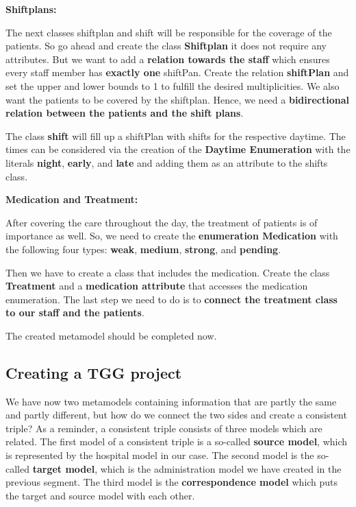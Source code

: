 \textbf{Shiftplans:}

The next classes shiftplan and shift will be responsible for the coverage of the patients. So go ahead and create the class \textbf{Shiftplan} it does not require any attributes. But we want to add a \textbf{relation towards the staff} which ensures every staff member has \textbf{exactly one} shiftPan. Create the relation \textbf{shiftPlan} and set the upper and lower bounds to 1 to fulfill the desired multiplicities. We also want the patients to be covered by the shiftplan. Hence, we need a \textbf{bidirectional relation between the patients and the shift plans}.


The class \textbf{shift} will fill up a shiftPlan with shifts for the respective daytime. The times can be considered via the creation of the \textbf{Daytime Enumeration} with the literals \textbf{night}, \textbf{early}, and \textbf{late} and adding them as an attribute to the shifts class.\newline

\textbf{Medication and Treatment:}

After covering the care throughout the day, the treatment of patients is of importance as well. So, we need to create the \textbf{enumeration Medication} with the following four types: \textbf{weak}, \textbf{medium}, \textbf{strong}, and \textbf{pending}.

Then we have to create a class that includes the medication. Create the class \textbf{Treatment} and a \textbf{medication attribute} that accesses the medication enumeration. The last step we need to do is to \textbf{connect the treatment class to our staff and the patients}. \newline

The created metamodel should be completed now.

\subsection{Creating a TGG project}



We have now two metamodels containing information that are partly the same and partly different, but how do we connect the two sides and create a consistent triple? As a reminder, a consistent triple consists of three models which are related. The first model of a consistent triple is a so-called \textbf{source model}, which is represented by the hospital model in our case. The second model is the so-called \textbf{target model}, which is the administration model we have created in the previous segment. The third model is the \textbf{correspondence model} which puts the target and source model with each other.\newline

